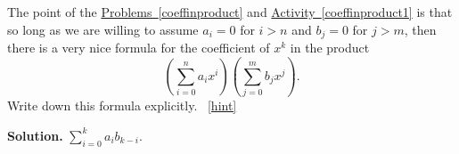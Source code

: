 \documentclass{book}
\begin{document}
\setcounter{project}{247}
\addtocounter{project}{-1}
\begin{activity}[]\label{coeffinproduct2}
\hypertarget{p-1356}{}%
The point of the \hyperref[coeffinproduct]{Problems~\ref{coeffinproduct}} and \hyperref[coeffinproduct1]{Activity~\ref{coeffinproduct1}} is that so long as we are willing to assume \(a_i=0\) for \(i>n\) and \(b_j =0\) for \(j>m\), then there is a very nice formula for the coefficient of \(x^k\) in the product%
\begin{equation*}
\left(\sum_{i=0}^n a_ix^i\right)\left(\sum_{j=0}^m b_jx^j\right).
\end{equation*}
Write down this formula explicitly.%
~\hfill{\tiny\hyperlink{a-247}{[hint]}\hypertarget{q-247}{}}\par\smallskip%
\noindent\textbf{Solution.}\hypertarget{solution-182}{}\quad%
\hypertarget{p-1358}{}%
\(\sum_{i=0}^k a_ib_{k-i}\).%
\end{activity}
\end{document}
